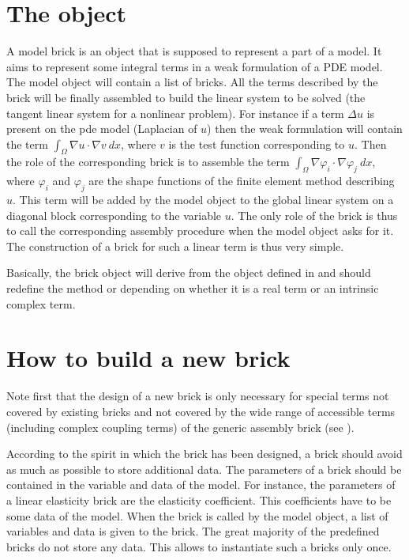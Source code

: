 \documentclass[a4paper,11pt,english]{sphinxmanual}
\begin{document}
\section{The  object}
\label{\detokenize{userdoc/model_object:the-br-object}}
A model brick is an object that is supposed to represent a part of a model. It
aims to represent some integral terms in a weak formulation of a PDE model. The
model object will contain a list of bricks. All the terms described by the brick
will be finally assembled to build the linear system to be solved (the tangent
linear system for a nonlinear problem). For instance if a term \(\Delta u\) is
present on the pde model (Laplacian of \(u\)) then the weak formulation will
contain the term \(\int_{\Omega}\nabla u\cdot\nabla v\ dx\), where \(v\)
is the test function corresponding to \(u\). Then the role of the
corresponding brick is to assemble the term \(\int_{\Omega}\nabla\varphi_i
\cdot\nabla\varphi_j\ dx\), where \(\varphi_i\) and \(\varphi_j\) are the
shape functions of the finite element method describing \(u\). This term will
be added by the model object to the global linear system on a diagonal block
corresponding to the variable \(u\). The only role of the brick is thus to
call the corresponding assembly procedure when the model object asks for it. The
construction of a brick for such a linear term is thus very simple.

Basically, the brick object will derive from the object  defined
in  and should redefine the method
 or  depending on whether
it is a real term or an intrinsic complex term.


\section{How to build a new brick}
\label{\detokenize{userdoc/model_object:how-to-build-a-new-brick}}
Note first that the design of a new brick is only necessary for special terms
not covered by existing bricks and not covered by the wide range of accessible
terms (including complex coupling terms) of the generic assembly brick
(see {\hyperref[\detokenize{userdoc/model_generic_assembly:ud-model-generic-assembly}]{}}).

According to the spirit in which the brick has been designed, a brick should avoid
as much as possible to store additional data. The parameters of a brick should be
contained in the variable and data of the model. For instance, the parameters of a
linear elasticity brick are the elasticity coefficient. This coefficients have to
be some data of the model. When the brick is called by the model object, a list of
variables and data is given to the brick. The great majority of the predefined
bricks do not store any data. This allows to instantiate such a bricks only once.
\end{document}
